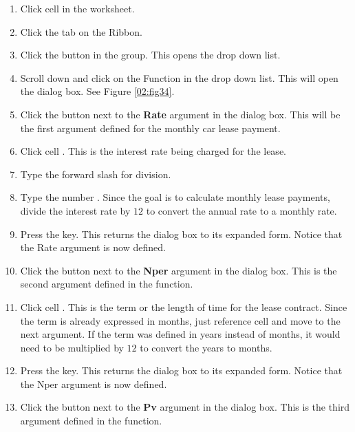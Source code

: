 \begin{enumerate}
	\item Click cell  in the  worksheet.
	\item Click the  tab on the Ribbon.
	\item Click the  button in the  group. This opens the  drop down list.
	\item Scroll down and click on the  Function in the drop down list. This will open the  dialog box. See Figure \ref{02:fig34}.
	\item Click the  button next to the \textbf{Rate} argument in the  dialog box. This will be the first argument defined for the monthly car lease payment.
	\item Click cell . This is the interest rate being charged for the lease.
	\item Type the forward slash \fmtTyping{/} for division.
	\item Type the number . Since the goal is to calculate monthly lease payments, divide the interest rate by $ 12 $ to convert the annual rate to a monthly rate.
	\item Press the  key. This returns the  dialog box to its expanded form. Notice that the Rate argument is now defined.
	\item Click the  button next to the \textbf{Nper} argument in the  dialog box. This is the second argument defined in the function.
	\item Click cell . This is the term or the length of time for the lease contract. Since the term is already expressed in months, just reference cell  and move to the next argument. If the term was defined in years instead of months, it would need to be multiplied by $ 12 $ to convert the years to months.
	\item Press the  key. This returns the  dialog box to its expanded form. Notice that the Nper argument is now defined.
	\item Click the  button next to the \textbf{Pv} argument in the  dialog box. This is the third argument defined in the function.

\end{enumerate}
